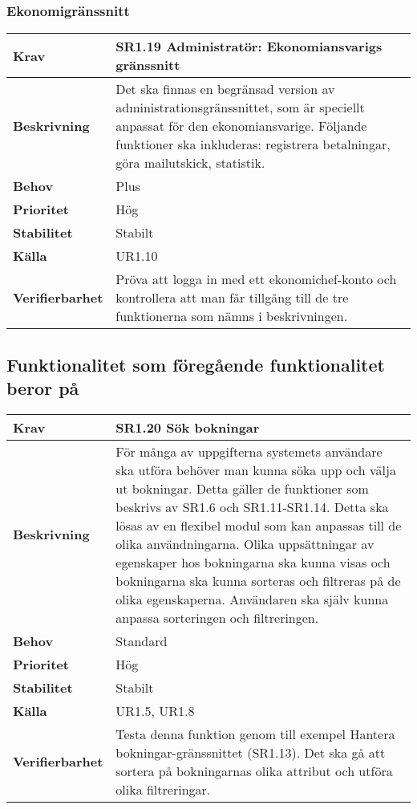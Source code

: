 \documentclass[a4paper, twoside, 11pt, titlepage]{article}
\begin{document}
		\subsubsection{Ekonomigränssnitt}


		\begin{tabular} { p{2.6cm} p{12.5cm} }
			\hline
			\sffamily\textbf{Krav} & \sffamily\textbf{SR1.19 Administratör: Ekonomiansvarigs gränssnitt } \\
			\hline
			\sffamily\textbf{Beskrivning} & Det ska finnas en begränsad version av administrationsgränssnittet, som är speciellt anpassat för den ekonomiansvarige. Följande funktioner ska inkluderas: registrera betalningar, göra mailutskick, statistik.  \\
			\hline
			\sffamily\textbf{Behov} & Plus  \\
			\hline
			\sffamily\textbf{Prioritet} & Hög  \\
			\hline
			\sffamily\textbf{Stabilitet} & Stabilt  \\
			\hline
			\sffamily\textbf{Källa} & UR1.10  \\
			\hline
			\sffamily\textbf{Verifierbarhet} & Pröva att logga in med ett ekonomichef-konto och kontrollera att man får tillgång till de tre funktionerna som nämns i beskrivningen.  \\
			\hline
		\end{tabular}


	\subsection{Funktionalitet som föregående funktionalitet beror på}


	\begin{tabular} { p{2.6cm} p{12.5cm} }
		\hline
		\sffamily\textbf{Krav} & \sffamily\textbf{SR1.20 Sök bokningar } \\
		\hline
		\sffamily\textbf{Beskrivning} & För många av uppgifterna systemets användare ska utföra behöver man kunna söka upp och välja ut bokningar. Detta gäller de funktioner som beskrivs av SR1.6 och SR1.11-SR1.14. Detta ska lösas av en flexibel modul som kan anpassas till de olika användningarna. Olika uppsättningar av egenskaper hos bokningarna ska kunna visas och bokningarna ska kunna sorteras och filtreras på de olika egenskaperna. Användaren ska själv kunna anpassa sorteringen och filtreringen.  \\
		\hline
		\sffamily\textbf{Behov} & Standard  \\
		\hline
		\sffamily\textbf{Prioritet} & Hög  \\
		\hline
		\sffamily\textbf{Stabilitet} & Stabilt  \\
		\hline
		\sffamily\textbf{Källa} & UR1.5, UR1.8  \\
		\hline
		\sffamily\textbf{Verifierbarhet} & Testa denna funktion genom till exempel Hantera bokningar-gränssnittet (SR1.13). Det ska gå att sortera på bokningarnas olika attribut och utföra olika filtreringar.  \\
		\hline
	\end{tabular}
	\vspace{6mm}
\end{document}
